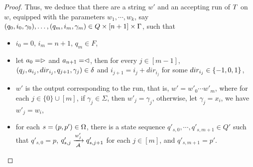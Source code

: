 \begin{proof}
Thus, we deduce that 
there are a string $w' $ and an accepting run of $T$ on $w$, equipped with the parameters $w_1,\cdots, w_k$, say $(q_0, i_0, \gamma_0),\ldots, (q_m, i_m, \gamma_m) \in Q \times [n+1] \times \Gamma$, such that 
%
\begin{itemize}
\item $i_0=0$, $i_m = n+1$, $q_m \in F$,
%
\item let $a_0 = \vartriangleright$ and $a_{n+1} = \vartriangleleft$,  then for every $j \in [m-1]$, $(q_j, a_{i_j}, dir_{i_j}, q_{j+1}, \gamma_j) \in
        \delta$ and $i_{j+1} = i_j + dir_{i_j}$ for some $dir_{i_j} \in \{-1, 0, 1\}$, 
 \item $w'$ is the output corresponding to the run, that is, $ w' = w'_0 \cdots w'_m$, where for each $j \in \{0\} \cup [m]$, if $\gamma_j \in \Sigma$, then $w'_j = \gamma_j$, otherwise, let $\gamma_j = x_i$, we have $w'_j = w_i$,
 \item  for each $s=(p, p') \in \Omega$, there is a state sequence $q'_{s,0}, \cdots, q'_{s,m+1} \in Q'$ such that  $q'_{s,0}= p$, $q'_{s,j} \xrightarrow[\mathcal{A}]{w'_j} q'_{s, j+1}$ for each $j \in [m]$,  and $q'_{s, m+1} = p'$.
\end{itemize}


\end{proof}
